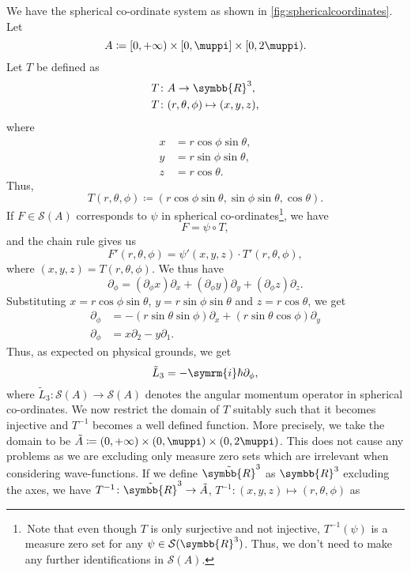 \documentclass[12pt, a4 paper]{article}
\let\symcal\mathcal
\theoremstyle{definition}
\newcommand{\rthree}{\symbb{R}^3}
\newcommand{\rr}{\symbb{R}}
\newcommand{\schwartz}{\symcal{S}}
\newcommand{\schwartzrthree}{\schwartz(\rr^3)}
\renewcommand{\i}{\symrm{i}}
\renewcommand{\pi}{\muppi}
\begin{document}
    We have the spherical co-ordinate system as shown in \cref{fig:sphericalcoordinates}. Let
    \[
        A \coloneq [0, +\infty) \times [0,\pi] \times [0,2\pi).
    \]
    Let $T$ be defined as
    \begin{align*}
        T &\colon A \rightarrow \rthree,\\
        T &\colon (r, \theta, \phi) \mapsto (x, y, z),
    \end{align*}
    where
    \begin{align*}
        x &= r \cos{\phi} \sin{\theta},\\
        y &= r \sin{\phi} \sin{\theta},\\
        z &= r \cos{\theta}.
    \end{align*}
    Thus,
    \[
        T(r, \theta, \phi) \coloneq (r \cos{\phi} \sin{\theta}, \sin{\phi} \sin{\theta}, \cos{\theta}).
    \]
    If $F \in \schwartz(A)$ corresponds to $\psi$ in spherical co-ordinates\footnote{\,Note that even though $T$ is only surjective and not injective, $T^{-1}(\psi)$ is a measure zero set for any $\psi \in \schwartzrthree$. Thus, we don't need to make any further identifications in $\schwartz(A)$.}, we have
    \[
        F = \psi \circ T,
    \]
    and the chain rule gives us
    \[
        F'(r, \theta, \phi) = \psi'(x,y,z) \cdot T'(r, \theta, \phi),
    \]
    where $(x,y,z) = T(r, \theta, \phi)$. We thus have
    \[
        \partial_\phi = (\partial_\phi x)\partial_x + (\partial_\phi y)\partial_y + (\partial_\phi z)\partial_z.
    \]
    Substituting $x = r \cos{\phi} \sin{\theta}$, $y = r \sin{\phi} \sin{\theta}$ and $z = r \cos{\theta}$, we get
    \begin{align*}
        \partial_\phi &= -(r \sin{\theta} \sin{\phi})\partial_x + (r \sin{\theta} \cos{\phi})\partial_y\\
        \partial_\phi &= x\partial_2 - y\partial_1.
    \end{align*}
    Thus, as expected on physical grounds, we get
    \[
        \tilde{L}_3 = -\i\hbar\partial_\phi,
    \]
    where $\tilde{L}_3 \colon \schwartz(A) \rightarrow \schwartz(A)$ denotes the angular momentum operator in spherical co-ordinates.
    We now restrict the domain of $T$ suitably such that it becomes injective and $T^{-1}$ becomes a well defined function. More precisely, we take the domain to be $\tilde{A} \coloneq (0, +\infty) \times (0,\pi) \times (0,2\pi)$. This does not cause any problems as we are excluding only measure zero sets which are irrelevant when considering wave-functions. If we define $\tilde{\rr}^3$ as $\rthree$ excluding the axes, we have $T^{-1} \colon \tilde{\rr}^3 \rightarrow \tilde{A}$, $T^{-1} \colon (x, y, z) \mapsto (r, \theta, \phi)$ as
\end{document}
